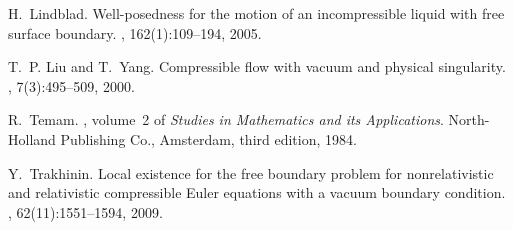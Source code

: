 \documentclass[12pt,twoside,reqno]{amsart}
\numberwithin{equation}{section}
\theoremstyle{definition}
\theoremstyle{remark}
\begin{document}
\begin{thebibliography}{10}
H.~Lindblad.
\newblock Well-posedness for the motion of an incompressible liquid with free
  surface boundary.
, 162(1):109--194, 2005.

T.~P. Liu and T.~Yang.
\newblock Compressible flow with vacuum and physical singularity.
, 7(3):495--509, 2000.

R.~Temam.
, volume~2 of {\em Studies in
  Mathematics and its Applications}.
\newblock North-Holland Publishing Co., Amsterdam, third edition, 1984.

Y.~Trakhinin.
\newblock Local existence for the free boundary problem for nonrelativistic and
  relativistic compressible {E}uler equations with a vacuum boundary condition.
, 62(11):1551--1594, 2009.

\end{thebibliography}
\end{document}
